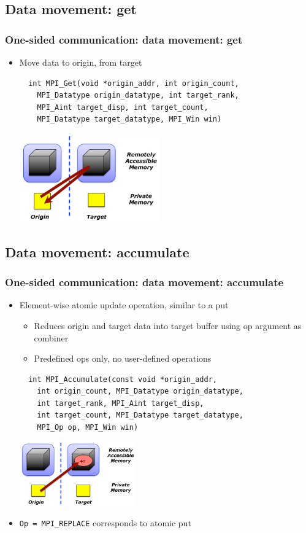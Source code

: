 \documentclass{beamer}
\begin{document}
\subsection{Data movement: get}
\begin{frame}[fragile]
  \frametitle{One-sided communication: data movement: get}
\begin{itemize}
\item Move data to origin, from target
{\color{mycolorcode}
\begin{verbatim}
  int MPI_Get(void *origin_addr, int origin_count,
    MPI_Datatype origin_datatype, int target_rank,
    MPI_Aint target_disp, int target_count,
    MPI_Datatype target_datatype, MPI_Win win)
\end{verbatim}
}
\includegraphics[width=6.0cm]{graphs/get.png}
\end{itemize}
\end{frame}

\subsection{Data movement: accumulate}
\begin{frame}[fragile]
  \frametitle{One-sided communication: data movement: accumulate}
\begin{itemize}
\item Element-wise atomic update operation, similar to a put
\begin{itemize}
\item Reduces origin and target data into target buffer using op
argument as combiner
\item Predefined ops only, no user-defined operations
\end{itemize}
{\color{mycolorcode}
\begin{verbatim}
  int MPI_Accumulate(const void *origin_addr, 
    int origin_count, MPI_Datatype origin_datatype, 
    int target_rank, MPI_Aint target_disp, 
    int target_count, MPI_Datatype target_datatype, 
    MPI_Op op, MPI_Win win)
\end{verbatim}
}
\includegraphics[width=5.0cm]{graphs/accumulate.png}
\item {\color{mycolorcode}\verb|Op = MPI_REPLACE|} corresponds to atomic put
\end{itemize}
\end{frame}
\end{document}
